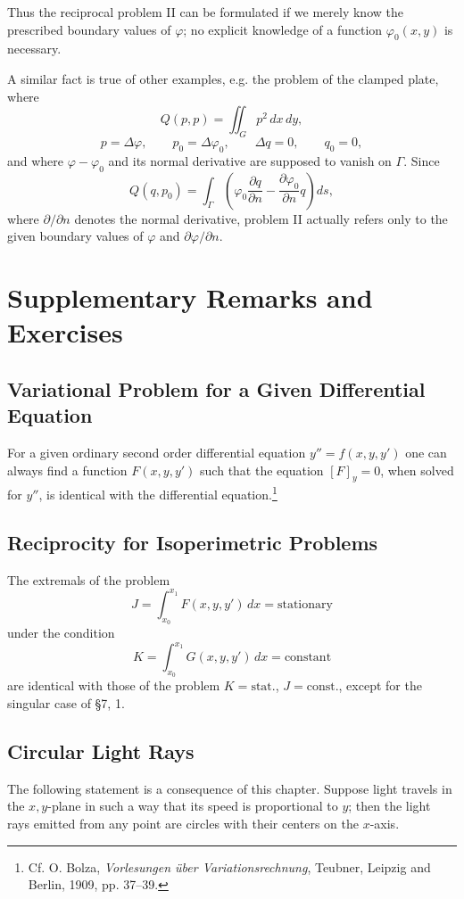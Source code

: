 Thus the reciprocal problem II can be formulated if we merely know the prescribed boundary values of $\varphi$; no explicit knowledge of a function $\varphi_0(x,y)$ is necessary.

A similar fact is true of other examples, e.g. the problem of the clamped plate, where
\[
Q(p,p)=\iint_Gp^2\,dx\,dy,
\]
\[
p=\Delta\varphi,\qquad p_0=\Delta\varphi_0,\qquad \Delta q=0,\qquad q_0=0,
\]
and where $\varphi-\varphi_0$ and its normal derivative are supposed to vanish on $\Gamma$. Since
\[
Q(q,p_0)=\int_\Gamma\left(\varphi_0\frac{\partial q}{\partial n}-\frac{\partial\varphi_0}{\partial n}q\right)ds,
\]
where $\partial/\partial n$ denotes the normal derivative, problem II actually refers only to the given boundary values of $\varphi$ and $\partial\varphi/\partial n$.

\section{Supplementary Remarks and Exercises}

\subsection{Variational Problem for a Given Differential Equation}
For a given ordinary second order differential equation $y''=f(x,y,y')$ one can always find a function $F(x,y,y')$ such that the equation $[F]_y=0$, when solved for $y''$, is identical with the differential equation.\footnote{Cf. O. Bolza, \emph{Vorlesungen \"uber Variationsrechnung}, Teubner, Leipzig and Berlin, 1909, pp. 37--39.}

\subsection{Reciprocity for Isoperimetric Problems}
The extremals of the problem
\[
J=\int_{x_0}^{x_1}F(x,y,y')\,dx=\text{stationary}
\]
under the condition
\[
K=\int_{x_0}^{x_1}G(x,y,y')\,dx=\text{constant}
\]
are identical with those of the problem $K=\text{stat.}$, $J=\text{const.}$, except for the singular case of \S7, 1.

\subsection{Circular Light Rays}
The following statement is a consequence of this chapter. Suppose light travels in the $x,y$-plane in such a way that its speed is proportional to $y$; then the light rays emitted from any point are circles with their centers on the $x$-axis.


